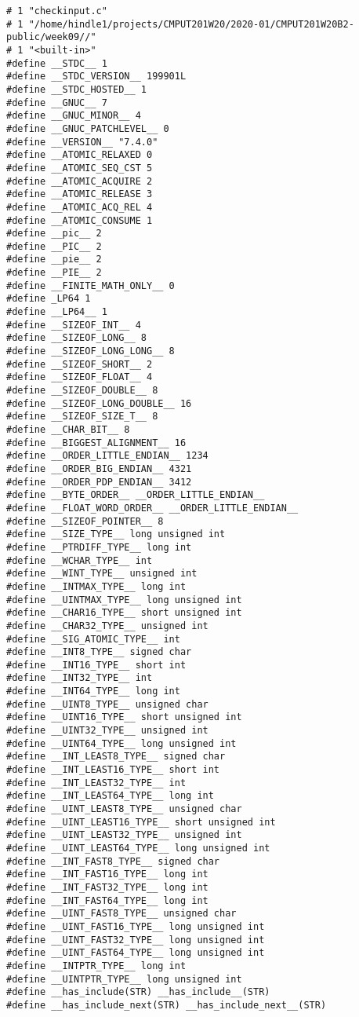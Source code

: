 \documentclass[11pt]{article}
\begin{document}
\begin{enumerate}
\begin{verbatim}
# 1 "checkinput.c"
# 1 "/home/hindle1/projects/CMPUT201W20/2020-01/CMPUT201W20B2-public/week09//"
# 1 "<built-in>"
#define __STDC__ 1
#define __STDC_VERSION__ 199901L
#define __STDC_HOSTED__ 1
#define __GNUC__ 7
#define __GNUC_MINOR__ 4
#define __GNUC_PATCHLEVEL__ 0
#define __VERSION__ "7.4.0"
#define __ATOMIC_RELAXED 0
#define __ATOMIC_SEQ_CST 5
#define __ATOMIC_ACQUIRE 2
#define __ATOMIC_RELEASE 3
#define __ATOMIC_ACQ_REL 4
#define __ATOMIC_CONSUME 1
#define __pic__ 2
#define __PIC__ 2
#define __pie__ 2
#define __PIE__ 2
#define __FINITE_MATH_ONLY__ 0
#define _LP64 1
#define __LP64__ 1
#define __SIZEOF_INT__ 4
#define __SIZEOF_LONG__ 8
#define __SIZEOF_LONG_LONG__ 8
#define __SIZEOF_SHORT__ 2
#define __SIZEOF_FLOAT__ 4
#define __SIZEOF_DOUBLE__ 8
#define __SIZEOF_LONG_DOUBLE__ 16
#define __SIZEOF_SIZE_T__ 8
#define __CHAR_BIT__ 8
#define __BIGGEST_ALIGNMENT__ 16
#define __ORDER_LITTLE_ENDIAN__ 1234
#define __ORDER_BIG_ENDIAN__ 4321
#define __ORDER_PDP_ENDIAN__ 3412
#define __BYTE_ORDER__ __ORDER_LITTLE_ENDIAN__
#define __FLOAT_WORD_ORDER__ __ORDER_LITTLE_ENDIAN__
#define __SIZEOF_POINTER__ 8
#define __SIZE_TYPE__ long unsigned int
#define __PTRDIFF_TYPE__ long int
#define __WCHAR_TYPE__ int
#define __WINT_TYPE__ unsigned int
#define __INTMAX_TYPE__ long int
#define __UINTMAX_TYPE__ long unsigned int
#define __CHAR16_TYPE__ short unsigned int
#define __CHAR32_TYPE__ unsigned int
#define __SIG_ATOMIC_TYPE__ int
#define __INT8_TYPE__ signed char
#define __INT16_TYPE__ short int
#define __INT32_TYPE__ int
#define __INT64_TYPE__ long int
#define __UINT8_TYPE__ unsigned char
#define __UINT16_TYPE__ short unsigned int
#define __UINT32_TYPE__ unsigned int
#define __UINT64_TYPE__ long unsigned int
#define __INT_LEAST8_TYPE__ signed char
#define __INT_LEAST16_TYPE__ short int
#define __INT_LEAST32_TYPE__ int
#define __INT_LEAST64_TYPE__ long int
#define __UINT_LEAST8_TYPE__ unsigned char
#define __UINT_LEAST16_TYPE__ short unsigned int
#define __UINT_LEAST32_TYPE__ unsigned int
#define __UINT_LEAST64_TYPE__ long unsigned int
#define __INT_FAST8_TYPE__ signed char
#define __INT_FAST16_TYPE__ long int
#define __INT_FAST32_TYPE__ long int
#define __INT_FAST64_TYPE__ long int
#define __UINT_FAST8_TYPE__ unsigned char
#define __UINT_FAST16_TYPE__ long unsigned int
#define __UINT_FAST32_TYPE__ long unsigned int
#define __UINT_FAST64_TYPE__ long unsigned int
#define __INTPTR_TYPE__ long int
#define __UINTPTR_TYPE__ long unsigned int
#define __has_include(STR) __has_include__(STR)
#define __has_include_next(STR) __has_include_next__(STR)

\end{verbatim}
\end{enumerate}
\end{document}
